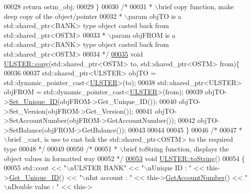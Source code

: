 \begin{DoxyCode}
00028     \textcolor{keywordflow}{return} ostm\_obj;
00029 \}
00030 \textcolor{comment}{/*}
00031 \textcolor{comment}{ * \(\backslash\)brief copy function, make deep copy of the object/pointer}
00032 \textcolor{comment}{ * \(\backslash\)param objTO is a std::shared\_ptr<BANK> type object casted back from std::shared\_ptr<OSTM>}
00033 \textcolor{comment}{ * \(\backslash\)param objFROM is a std::shared\_ptr<BANK> type object casted back from std::shared\_ptr<OSTM>}
00034 \textcolor{comment}{ */} 
\hypertarget{_u_l_s_t_e_r_8cpp_source.tex_l00035}{}\hyperlink{class_u_l_s_t_e_r_aeef5c3e20f2a82344b4b83e5ccf4cc40_aeef5c3e20f2a82344b4b83e5ccf4cc40}{00035} \textcolor{keywordtype}{void} \hyperlink{class_u_l_s_t_e_r_aeef5c3e20f2a82344b4b83e5ccf4cc40_aeef5c3e20f2a82344b4b83e5ccf4cc40}{ULSTER::copy}(std::shared\_ptr<OSTM> to, std::shared\_ptr<OSTM> from)\{
00036 
00037     std::shared\_ptr<ULSTER> objTO = std::dynamic\_pointer\_cast<\hyperlink{class_u_l_s_t_e_r}{ULSTER}>(to);
00038     std::shared\_ptr<ULSTER> objFROM = std::dynamic\_pointer\_cast<\hyperlink{class_u_l_s_t_e_r}{ULSTER}>(from);
00039     objTO->\hyperlink{class_o_s_t_m_ab5019a32185631c08abbf826422f2d93_ab5019a32185631c08abbf826422f2d93}{Set\_Unique\_ID}(objFROM->Get\_Unique\_ID());
00040     objTO->Set\_Version(objFROM->Get\_Version());
00041     objTO->SetAccountNumber(objFROM->GetAccountNumber());
00042     objTO->SetBalance(objFROM->GetBalance());
00043 
00044     
00045 \}
00046 \textcolor{comment}{/*}
00047 \textcolor{comment}{ * \(\backslash\)brief \_cast, is use to cast bak the std::shared\_ptr<OSTM> to the required type}
00048 \textcolor{comment}{ */}
00049 
00050 \textcolor{comment}{/*}
00051 \textcolor{comment}{ *  \(\backslash\)brief toString function, displays the object values in formatted way}
00052 \textcolor{comment}{ */}
\hypertarget{_u_l_s_t_e_r_8cpp_source.tex_l00053}{}\hyperlink{class_u_l_s_t_e_r_a341bbcb3f7d6ef10f30d4734ceed10ee_a341bbcb3f7d6ef10f30d4734ceed10ee}{00053} \textcolor{keywordtype}{void} \hyperlink{class_u_l_s_t_e_r_a341bbcb3f7d6ef10f30d4734ceed10ee_a341bbcb3f7d6ef10f30d4734ceed10ee}{ULSTER::toString}()
00054 \{
00055    std::cout << \textcolor{stringliteral}{"\(\backslash\)nULSTER BANK"} << \textcolor{stringliteral}{"\(\backslash\)nUnique ID : "} << this->\hyperlink{class_o_s_t_m_a5a01a8b98d16b1d1904ecf9356e7b71d_a5a01a8b98d16b1d1904ecf9356e7b71d}{Get\_Unique\_ID}() << \textcolor{stringliteral}{"\(\backslash\)nInt account
       : "} << this->\hyperlink{class_u_l_s_t_e_r_a1ad672ae865a9f559bf4d3c33c243d63_a1ad672ae865a9f559bf4d3c33c243d63}{GetAccountNumber}() << \textcolor{stringliteral}{"\(\backslash\)nDouble value : "} << this->

\end{DoxyCode}
